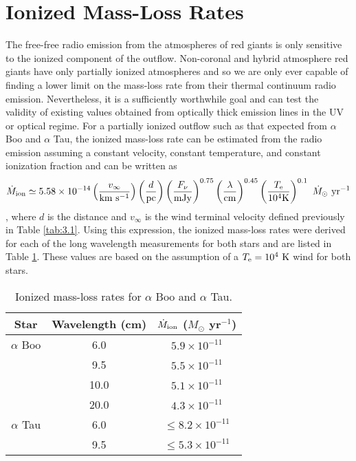 \section{Ionized Mass-Loss Rates}\label{sec:6.5b}

The free-free radio emission from the atmospheres of red giants is only sensitive to the ionized component of the outflow. Non-coronal and hybrid atmosphere red giants have only partially ionized atmospheres and so we are only ever capable of finding a lower limit on the mass-loss rate from their thermal continuum radio emission. Nevertheless, it is a sufficiently worthwhile goal and can test the validity of existing values obtained from optically thick emission lines in the UV or optical regime. For a partially ionized outflow such as that expected from $\alpha$ Boo and $\alpha$ Tau, the ionized mass-loss rate can be estimated from the radio emission assuming a constant velocity, constant temperature, and constant ionization fraction and can be written as  
\begin{equation}
\dot{M}_{\rm{ion}} \simeq 5.58 \times 10^{-14} \left(\frac{v_{\infty}}{\rm{km \  s^{-1}}}\right) \left(\frac{d}{\rm{pc}}\right)\left( \frac{F_{\nu}}{\rm{mJy}} \right)^{0.75} \left( \frac{\lambda}{\rm{cm}} \right)^{0.45} \left( \frac{T_{\rm{e}}}{10^4 \rm{K}} \right)^{0.1} \ \dot{M}_{\odot} \ \rm{yr}^{-1} 
\label{eq:6.5b}
\end{equation}
\citep[e.g.,][]{drake_1986}, where $d$ is the distance and $v_{\infty}$ is the wind terminal velocity defined previously in Table \ref{tab:3.1}. Using this expression, the ionized mass-loss rates were derived for each of the long wavelength measurements for both stars and are listed in Table \ref{tab:6.5b}. These values are based on the assumption of a $T_{\rm{e}} = 10^4 \ \rm{K}$  wind for both stars. 

\begin{table}[!hb]
\begin{center}
\caption[Ionized mass-loss rates for $\alpha$ Boo and $\alpha$ Tau]{Ionized mass-loss rates for $\alpha$ Boo and $\alpha$ Tau.}
\begin{tabular}{ccc}
\hline
\hline
\rule{0pt}{2.5ex}Star & Wavelength (cm) & $\dot{M} _{\rm{ion}}$ ($M _{\odot}$ yr$^{-1}$) \\
\hline
\rule{0pt}{2.5ex}$\alpha$ Boo				& 6.0  & $5.9 \times 10^{-11}$ \\
							& 9.5  & $5.5 \times 10^{-11}$ \\
							& 10.0  & $5.1 \times 10^{-11}$ \\
							& 20.0  & $4.3 \times 10^{-11}$ \\
$\alpha$ Tau				& 6.0  & $\leq 8.2 \times 10^{-11}$ \\
							& 9.5 & $\leq 5.3 \times 10^{-11}$ \\
\hline
\end{tabular}
\label{tab:6.5b}
\end{center}
\end{table}

